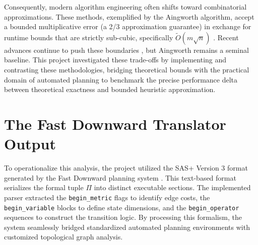 Consequently, modern algorithm engineering often shifts toward combinatorial approximations. These methods, exemplified by the Aingworth algorithm, accept a bounded multiplicative error (a 2/3 approximation guarantee) in exchange for runtime bounds that are strictly sub-cubic, specifically $\tilde{O}(m\sqrt{n})$ \cite{aingworth96}. Recent advances continue to push these boundaries \cite{arxiv2025}, but Aingworth remains a seminal baseline. This project investigated these trade-offs by implementing and contrasting these methodologies, bridging theoretical bounds with the practical domain of automated planning to benchmark the precise performance delta between theoretical exactness and bounded heuristic approximation.

\section{The Fast Downward Translator Output}
To operationalize this analysis, the project utilized the SAS+ Version 3 format generated by the Fast Downward planning system \cite{fastdownward, sasdocs}. This text-based format serializes the formal tuple $\Pi$ into distinct executable sections. The implemented parser extracted the \texttt{begin\_metric} flags to identify edge costs, the \texttt{begin\_variable} blocks to define state dimensions, and the \texttt{begin\_operator} sequences to construct the transition logic. By processing this formalism, the system seamlessly bridged standardized automated planning environments with customized topological graph analysis.

